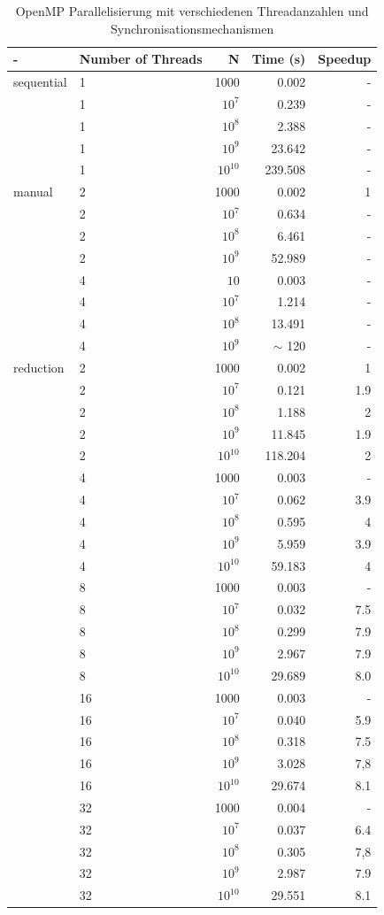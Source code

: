 \documentclass{report}
\begin{document}
   \begin{table}     
	\begin{tabular}{|l|l|r|r|r|}
		\hline
		- & Number of Threads & N & Time (s) & Speedup \\
		\hline
		sequential & 1 & 1000 & 0.002 & - \\
		& 1 & $10^{7}$ & 0.239 & - \\
		& 1 & $10^{8}$ & 2.388 & - \\
		& 1 & $10^{9}$ & 23.642 & - \\
		& 1 & $10^{10}$ & 239.508 & - \\
		\hline
		manual & 2 & 1000 & 0.002 & 1 \\
		 & 2 & $10^{7}$ & 0.634 & - \\
		 & 2 & $10^{8}$ & 6.461 & - \\
		 & 2 & $10^{9}$ & 52.989 & - \\
		 & 4 & $10$ & 0.003 & - \\
		 & 4 & $10^{7}$ & 1.214 & - \\
		 & 4 & $10^{8}$ & 13.491 & - \\
		 & 4 & $10^{9}$ & $\sim$ 120 & - \\
		\hline
		reduction & 2 & 1000 & 0.002 & 1 \\
		 & 2 & $10^{7}$ & 0.121 & 1.9 \\
		 & 2 & $10^{8}$ & 1.188 & 2 \\
		 & 2 & $10^{9}$ & 11.845 & 1.9 \\
		 & 2 & $10^{10}$ & 118.204 & 2 \\
		 & 4 & 1000 & 0.003 & - \\
		 & 4 & $10^{7}$ & 0.062 & 3.9 \\
		 & 4 & $10^{8}$ & 0.595 & 4 \\
		 & 4 & $10^{9}$ & 5.959 & 3.9 \\
		 & 4 & $10^{10}$ & 59.183 & 4 \\
		 & 8 & 1000 & 0.003 & - \\
		 & 8 & $ 10^{7} $ & 0.032 & 7.5 \\
		 & 8 & $ 10^{8} $ & 0.299 & 7.9 \\
		 & 8 & $ 10^{9} $ & 2.967 & 7.9 \\
		 & 8 & $10^{10}$ & 29.689 & 8.0 \\
		 & 16 & 1000 & 0.003 & - \\
		 & 16 & $ 10^{7} $ & 0.040 & 5.9 \\
		 & 16 & $ 10^{8} $ & 0.318 & 7.5 \\
		 & 16 & $ 10^{9} $ & 3.028 & 7,8 \\
		 & 16 & $10^{10}$ & 29.674 & 8.1\\
		 & 32 & 1000 & 0.004 & - \\
		 & 32 & $ 10^{7} $ & 0.037 & 6.4 \\
		 & 32 & $ 10^{8} $ & 0.305 & 7,8 \\
		 & 32 & $ 10^{9} $ & 2.987 & 7.9 \\
		 & 32 & $10^{10}$ & 29.551 & 8.1 \\
		\hline
	\end{tabular}
	\caption{OpenMP Parallelisierung mit verschiedenen Threadanzahlen und Synchronisationsmechanismen}
	\label{Table:1b}
\end{table}
	\newpage
\end{document}
